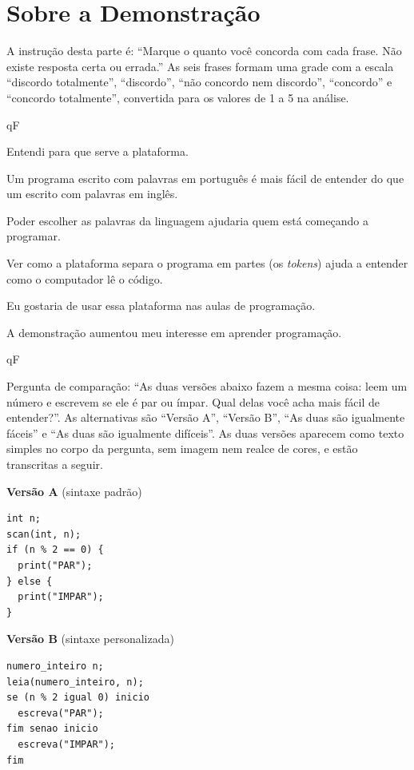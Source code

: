 \section{Sobre a Demonstração}

A instrução desta parte é: ``Marque o quanto você concorda com cada frase. Não existe resposta certa ou errada.'' As seis frases formam uma grade com a escala ``discordo totalmente'', ``discordo'', ``não concordo nem discordo'', ``concordo'' e ``concordo totalmente'', convertida para os valores de 1 a 5 na análise.

\begin{questoes}{qF}
    \item\label{qF:demo-ini} Entendi para que serve a plataforma.
    \item Um programa escrito com palavras em português é mais fácil de entender do que um escrito com palavras em inglês.
    \item Poder escolher as palavras da linguagem ajudaria quem está começando a programar.
    \item Ver como a plataforma separa o programa em partes (os \textit{tokens}) ajuda a entender como o computador lê o código.
    \item Eu gostaria de usar essa plataforma nas aulas de programação.
    \item\label{qF:demo-fim} A demonstração aumentou meu interesse em aprender programação.
\end{questoes}

\begin{questoes}{qF}
    \item\label{qF:comparacao} Pergunta de comparação: ``As duas versões abaixo fazem a mesma coisa: leem um número e escrevem se ele é par ou ímpar. Qual delas você acha mais fácil de entender?''. As alternativas são ``Versão A'', ``Versão B'', ``As duas são igualmente fáceis'' e ``As duas são igualmente difíceis''. As duas versões aparecem como texto simples no corpo da pergunta, sem imagem nem realce de cores, e estão transcritas a seguir.
\end{questoes}

\begin{center}
\begin{minipage}[t]{0.42\textwidth}
\textbf{Versão A} (sintaxe padrão)
\small
\begin{verbatim}
int n;
scan(int, n);
if (n % 2 == 0) {
  print("PAR");
} else {
  print("IMPAR");
}
\end{verbatim}
\end{minipage}
\hspace{0.05\textwidth}
\begin{minipage}[t]{0.48\textwidth}
\textbf{Versão B} (sintaxe personalizada)
\small
\begin{verbatim}
numero_inteiro n;
leia(numero_inteiro, n);
se (n % 2 igual 0) inicio
  escreva("PAR");
fim senao inicio
  escreva("IMPAR");
fim
\end{verbatim}
\end{minipage}
\end{center}

